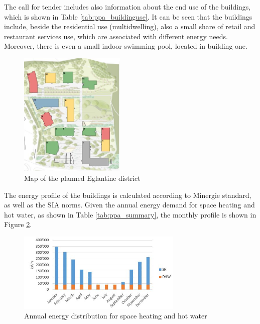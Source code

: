\documentclass{article}
\begin{document}
The call for tender includes also information about the end use of the buildings, which is shown in Table \ref{tab:ppa_buildinguse}. It can be seen that the buildings include, beside the residential use (multidwelling), also a small share of retail and restaurant services use, which are associated with different energy needs. Moreover, there is even a small indoor swimming pool, located in building one. 



\begin{figure}[htp]
\centering
\includegraphics[width=0.45\textwidth]{ppa_buildings.JPG}
\caption{Map of the planned Eglantine district}
\label{fig:ppa_buildings}
\end{figure}

The energy profile of the buildings is calculated according to Minergie standard, as well as the SIA norms. Given the annual energy demand for space heating and hot water, as shown in Table \ref{tab:ppa_summary}, the monthly profile is shown in Figure \ref{fig:ppa_energydemand}.

\begin{figure}[htp]
\centering
\includegraphics[width=0.7\textwidth]{ppa_energydemand.JPG}
\caption{Annual energy distribution for space heating and hot water}
\label{fig:ppa_energydemand}
\end{figure}
\end{document}
